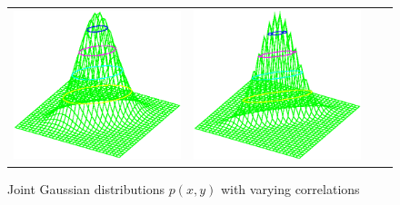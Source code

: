 \begin{figure}
\begin{tabular}{*{4}{c}}
  \includegraphics[width=\tw/4-15mm, height=\tw/4-15mm, clip=true]{../common/normxy_80.eps} & 
  \includegraphics[width=\tw/4-15mm, height=\tw/4-15mm, clip=true]{../common/normxy_95.eps}
\end{tabular}
\caption{
  Joint Gaussian distributions $p(x,y)$ with varying correlations
  \label{fig:psub_joint_gaussian}
  }
\end{figure}

